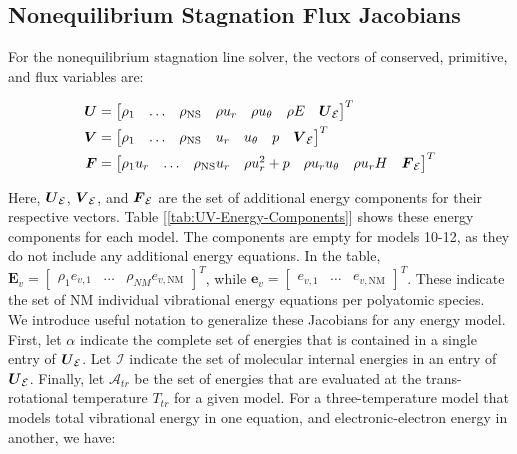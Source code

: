\documentclass[10pt]{article}
\begin{document}
\begin{flushleft}
\newpage
\section{Nonequilibrium Stagnation Flux Jacobians}

For the nonequilibrium stagnation line solver, the vectors of conserved, primitive, and flux variables are:

\begin{align*}
    \boldsymbol{U} &= 
    \begin{bmatrix}
        \rho_1 & \dots & \rho_\text{NS} & \rho u_r & \rho u_\theta & \rho E & \boldsymbol{U}_{\mathcal{E}}
    \end{bmatrix}^T
    \\
    \boldsymbol{V} &= 
    \begin{bmatrix}
        \rho_1 & \dots & \rho_\text{NS} & u_r & u_\theta & p & \boldsymbol{V}_{\mathcal{E}}
    \end{bmatrix}^T
    \\
    \boldsymbol{F} &= 
    \begin{bmatrix}
        \rho_1 u_r & \dots & \rho_\text{NS} u_r & \rho u_r^2 + p & \rho u_r u_\theta & \rho u_r H & \boldsymbol{F}_{\mathcal{E}}
    \end{bmatrix}^T
\end{align*}

Here, $\boldsymbol{U}_{\mathcal{E}}$, $\boldsymbol{V}_{\mathcal{E}}$, and $\boldsymbol{F}_{\mathcal{E}}$ are the set of additional energy components for their respective vectors. Table [\ref{tab:UV-Energy-Components}] shows these energy components for each model. The components are empty for models 10-12, as they do not include any additional energy equations. In the table, $\boldsymbol{E}_v = \begin{bmatrix} \rho_1 e_{v,1} & \dots & \rho_{NM} e_{v,\text{NM}} \end{bmatrix}^T$, while  $\boldsymbol{e}_v = \begin{bmatrix} e_{v,1} & \dots & e_{v,\text{NM}} \end{bmatrix}^T$. These indicate the set of NM individual vibrational energy equations per polyatomic species. \\

\vspace{5mm}
We introduce useful notation to generalize these Jacobians for any energy model. First, let $\alpha$ indicate the complete set of energies that is contained in a single entry of $\boldsymbol{U}_\mathcal{E}$. Let $\mathcal{I}$ indicate the set of molecular internal energies in an entry of $\boldsymbol{U}_\mathcal{E}$. Finally, let $\mathcal{A}_{tr}$ be the set of energies that are evaluated at the trans-rotational temperature $T_{tr}$ for a given model. For a three-temperature model that models total vibrational energy in one equation, and electronic-electron energy in another, we have:


\end{flushleft}
\end{document}
